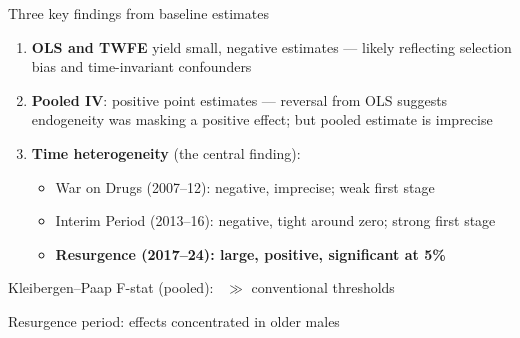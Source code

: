\documentclass[aspectratio=169]{beamer}
\begin{document}
\begin{frame}{Three key findings from baseline estimates}

\begin{enumerate}

    \item \textbf{OLS and TWFE} yield small, negative estimates --- likely reflecting selection bias and time-invariant confounders

    \vspace{0.4cm}

    \item \textbf{Pooled IV}: positive point estimates --- reversal from OLS suggests endogeneity was masking a positive effect; but pooled estimate is imprecise

    \vspace{0.4cm}

    \item \textbf{Time heterogeneity} (the central finding):
    \begin{itemize}
        \item War on Drugs (2007--12): negative, imprecise; weak first stage
        \item Interim Period (2013--16): negative, tight around zero; strong first stage
        \item \textbf{Resurgence (2017--24): large, positive, significant at 5\%}
    \end{itemize}

\end{enumerate}

\vspace{0.3cm}
\pause
Kleibergen--Paap F-stat (pooled): \Fstat\ $\gg$ conventional thresholds

\end{frame}


\begin{frame}{Resurgence period: effects concentrated in older males}

\begin{center}
\scalebox{0.72}{%
\begin{threeparttable}

\end{threeparttable}
}
\end{center}

\end{frame}
\end{document}
